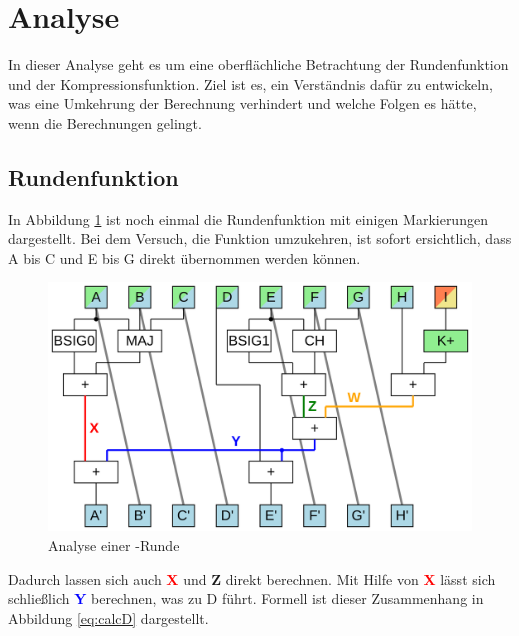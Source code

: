 \section{Analyse}
\label{sec:sha256:analyse}

In dieser Analyse geht es um eine oberflächliche Betrachtung der Rundenfunktion und der Kompressionsfunktion.
Ziel ist es, ein Verständnis dafür zu entwickeln, was eine Umkehrung der Berechnung verhindert und welche Folgen es
hätte, wenn die Berechnungen gelingt.

\subsection{Rundenfunktion}
\label{sec:ana:rundenfunktion}
In Abbildung \ref{fig:sha256coreA} ist noch einmal die Rundenfunktion mit einigen Markierungen dargestellt.
Bei dem Versuch, die Funktion umzukehren, ist sofort ersichtlich, dass A bis C und E bis G direkt übernommen werden können.

\begin{figure}[!h]
  \centering
  \includegraphics[scale=0.4]{images/sha256coreA}
  \caption{Analyse einer -Runde}
  \label{fig:sha256coreA}
\end{figure}

Dadurch lassen sich auch \textcolor{red}{\textbf{X}} und \textcolor{Strong Green}{\textbf{Z}} direkt berechnen.
Mit Hilfe von \textcolor{red}{\textbf{X}} lässt sich schließlich \textcolor{blue}{\textbf{Y}} berechnen, was zu D führt.
Formell ist dieser Zusammenhang in Abbildung \ref{eq:calcD} dargestellt.

